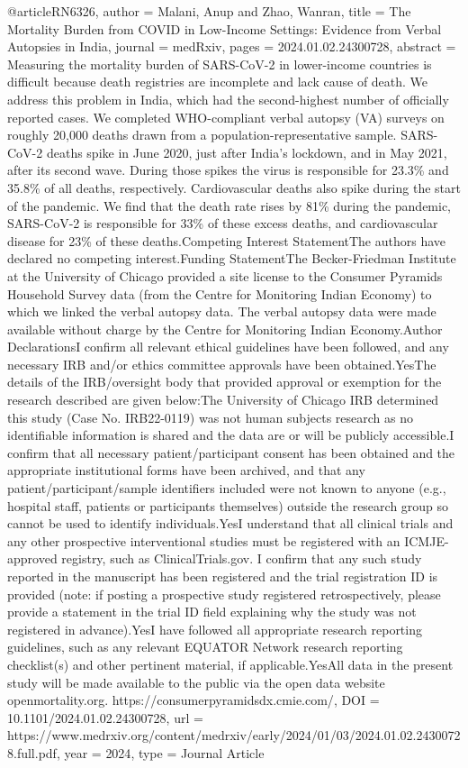 {{@article{RN6326,
   author = {Malani, Anup and Zhao, Wanran},
   title = {The Mortality Burden from COVID in Low-Income Settings: Evidence from Verbal Autopsies in India},
   journal = {medRxiv},
   pages = {2024.01.02.24300728},
   abstract = {Measuring the mortality burden of SARS-CoV-2 in lower-income countries is difficult because death registries are incomplete and lack cause of death. We address this problem in India, which had the second-highest number of officially reported cases. We completed WHO-compliant verbal autopsy (VA) surveys on roughly 20,000 deaths drawn from a population-representative sample. SARS-CoV-2 deaths spike in June 2020, just after India’s lockdown, and in May 2021, after its second wave. During those spikes the virus is responsible for 23.3\% and 35.8\% of all deaths, respectively. Cardiovascular deaths also spike during the start of the pandemic. We find that the death rate rises by 81\% during the pandemic, SARS-CoV-2 is responsible for 33\% of these excess deaths, and cardiovascular disease for 23\% of these deaths.Competing Interest StatementThe authors have declared no competing interest.Funding StatementThe Becker-Friedman Institute at the University of Chicago provided a site license to the Consumer Pyramids Household Survey data (from the Centre for Monitoring Indian Economy) to which we linked the verbal autopsy data. The verbal autopsy data were made available without charge by the Centre for Monitoring Indian Economy.Author DeclarationsI confirm all relevant ethical guidelines have been followed, and any necessary IRB and/or ethics committee approvals have been obtained.YesThe details of the IRB/oversight body that provided approval or exemption for the research described are given below:The University of Chicago IRB determined this study (Case No. IRB22-0119) was not human subjects research as no identifiable information is shared and the data are or will be publicly accessible.I confirm that all necessary patient/participant consent has been obtained and the appropriate institutional forms have been archived, and that any patient/participant/sample identifiers included were not known to anyone (e.g., hospital staff, patients or participants themselves) outside the research group so cannot be used to identify individuals.YesI understand that all clinical trials and any other prospective interventional studies must be registered with an ICMJE-approved registry, such as ClinicalTrials.gov. I confirm that any such study reported in the manuscript has been registered and the trial registration ID is provided (note: if posting a prospective study registered retrospectively, please provide a statement in the trial ID field explaining why the study was not registered in advance).YesI have followed all appropriate research reporting guidelines, such as any relevant EQUATOR Network research reporting checklist(s) and other pertinent material, if applicable.YesAll data in the present study will be made available to the public via the open data website openmortality.org. https://consumerpyramidsdx.cmie.com/},
   DOI = {10.1101/2024.01.02.24300728},
   url = {https://www.medrxiv.org/content/medrxiv/early/2024/01/03/2024.01.02.24300728.full.pdf},
   year = {2024},
   type = {Journal Article}
}



}}
